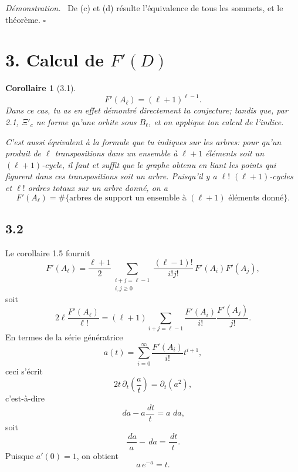 \documentclass[11pt]{article}
\newcommand{\dd}{\,d}
\newcommand{\card}{\#}
\theoremstyle{plainfr}
\newtheorem*{corollaire}{Corollaire}
\newenvironment{preuve}{\par\emph{Démonstration.}\ }{\hfill$\square$\par}
\begin{document}
\begin{preuve}
De (c) et (d) résulte l'équivalence de tous les sommets, et le théorème.
\end{preuve}

\section*{3. Calcul de $F'(D)$}

\begin{corollaire}[3.1]
\[
 F'(A_\ell)=(\ell+1)^{\ell-1}.
\]
Dans ce cas, tu as en effet démontré directement ta conjecture; tandis que, par 2.1, $\Xi'_c$ ne forme qu'une orbite sous $B_\ell$, et on applique ton calcul de l'indice.

C'est aussi équivalent à la formule que tu indiques sur les arbres: pour qu'un produit de $\ell$ transpositions dans un ensemble à $\ell+1$ éléments soit un $(\ell+1)$-cycle, il faut et suffit que le graphe obtenu en liant les points qui figurent dans ces transpositions soit un arbre. Puisqu'il y a $\ell!$ $(\ell+1)$-cycles et $\ell!$ ordres totaux sur un arbre donné, on a
\[
 F'(A_\ell)=\card\{\text{arbres de support un ensemble à }(\ell+1)\text{ éléments donné}\}.
\]
\end{corollaire}

\subsection*{3.2}
Le corollaire 1.5 fournit
\[
F'(A_\ell)=\frac{\ell+1}{2}
\sum_{\substack{i+j=\ell-1\\ i,j\ge0}}
\frac{(\ell-1)!}{i!j!}\,F'(A_i)F'(A_j),
\]
soit
\[
2\ell\frac{F'(A_\ell)}{\ell!}=(\ell+1)\sum_{i+j=\ell-1}\frac{F'(A_i)}{i!}\frac{F'(A_j)}{j!}.
\]
En termes de la série génératrice
\[
 a(t)=\sum_{i=0}^{\infty}\frac{F'(A_i)}{i!}t^{i+1},
\]
ceci s'écrit
\[
2t\,\partial_t\left(\frac{a}{t}\right)=\partial_t(a^2),
\]
c'est-à-dire
\[
 \dd a-a\frac{\dd t}{t}=a\,\dd a,
\]
soit
\[
 \frac{\dd a}{a}-\dd a=\frac{\dd t}{t}.
\]
Puisque $a'(0)=1$, on obtient
\[
 a\,e^{-a}=t.
\]
\end{document}
